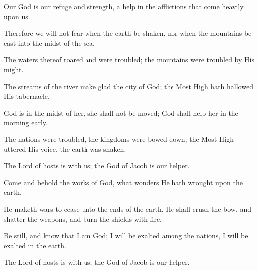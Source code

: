 Our God is our refuge and strength, a help in the afflictions that come heavily upon us.

Therefore we will not fear when the earth be shaken, nor when the mountains be cast into the midst of the sea.

The waters thereof roared and were troubled; the mountains were troubled by His might.

The streams of the river make glad the city of God; the Most High hath hallowed His tabernacle.

God is in the midst of her, she shall not be moved; God shall help her in the morning early.

The nations were troubled, the kingdoms were bowed down; the Most High uttered His voice, the earth was shaken.

The Lord of hosts is with us; the God of Jacob is our helper.

Come and behold the works of God, what wonders He hath wrought upon the earth.

He maketh wars to cease unto the ends of the earth. He shall crush the bow, and shatter the weapons, and burn the shields with fire.

Be still, and know that I am God; I will be exalted among the nations, I will be exalted in the earth.

The Lord of hosts is with us; the God of Jacob is our helper.
